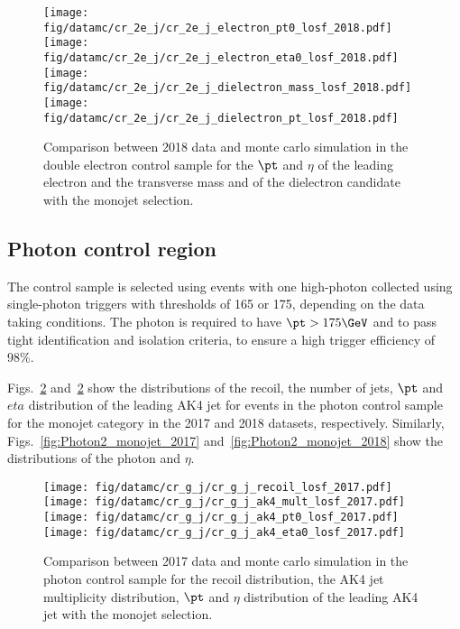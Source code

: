{\begin{figure}[htbp]
    \begin{center}
        \texttt{[image: fig/datamc/cr\_2e\_j/cr\_2e\_j\_electron\_pt0\_losf\_2018.pdf]}
        \texttt{[image: fig/datamc/cr\_2e\_j/cr\_2e\_j\_electron\_eta0\_losf\_2018.pdf]} \\
        \texttt{[image: fig/datamc/cr\_2e\_j/cr\_2e\_j\_dielectron\_mass\_losf\_2018.pdf]}
        \texttt{[image: fig/datamc/cr\_2e\_j/cr\_2e\_j\_dielectron\_pt\_losf\_2018.pdf]}
    \end{center}
    \caption{Comparison between 2018 data and monte carlo simulation in the double electron control sample for
        the $\pt$ and $\eta$ of the leading electron and the transverse mass and \pt of the dielectron candidate with the monojet selection.}
    \label{fig:DE2_monojet_2018}
\end{figure}

\newpage

\subsection{Photon control region}
\label{sec:selection_cr_g}

The \phojets control sample is selected using events with one high-\pt photon collected using single-photon triggers with \pt thresholds of 165 or 175\GeV, depending
on the data taking conditions. The photon is required to have $\pt > 175\GeV$ and to pass tight identification and isolation criteria, to ensure a high trigger efficiency of 98\%. 

Figs.~\ref{fig:Photon_monojet_2017} and~\ref{fig:Photon_monojet_2017} show the distributions of the recoil, the number of jets, $\pt$ and $eta$ distribution of the leading AK4 jet for events in the photon control sample for the monojet category in the 2017 and 2018 datasets, respectively. Similarly, Figs.~\ref{fig:Photon2_monojet_2017} and~\ref{fig:Photon2_monojet_2018} show the distributions of the photon \pt and $\eta$.

\begin{figure}[htbp]
    \begin{center}
        \texttt{[image: fig/datamc/cr\_g\_j/cr\_g\_j\_recoil\_losf\_2017.pdf]}
        \texttt{[image: fig/datamc/cr\_g\_j/cr\_g\_j\_ak4\_mult\_losf\_2017.pdf]} \\
        \texttt{[image: fig/datamc/cr\_g\_j/cr\_g\_j\_ak4\_pt0\_losf\_2017.pdf]}
        \texttt{[image: fig/datamc/cr\_g\_j/cr\_g\_j\_ak4\_eta0\_losf\_2017.pdf]}
    \end{center}
    \caption{Comparison between 2017 data and monte carlo simulation in the photon  control sample for
        the recoil distribution, the AK4 jet multiplicity distribution,  $\pt$ and $\eta$ distribution
        of the leading AK4  jet with the monojet selection.}
    \label{fig:Photon_monojet_2017}
\end{figure}

}
